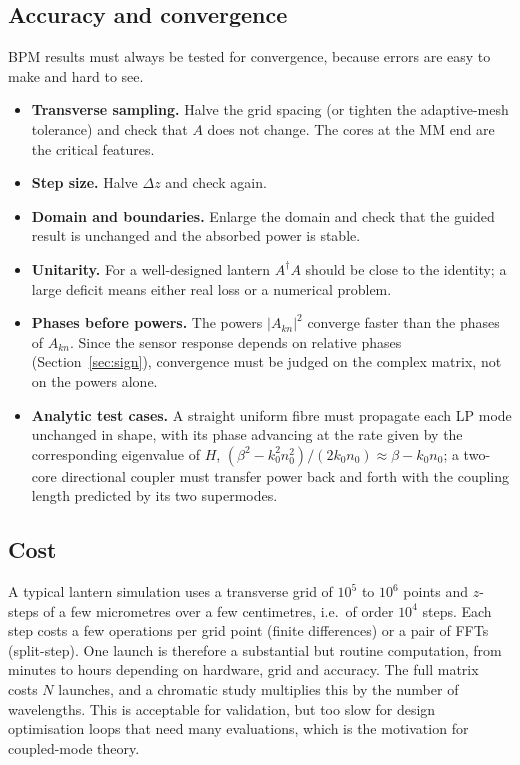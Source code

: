 \documentclass[11pt,a4paper]{article}
\begin{document}
\subsection{Accuracy and convergence}
BPM results must always be tested for convergence, because errors are easy to make and hard to see.
\begin{itemize}
\item \textbf{Transverse sampling.} Halve the grid spacing (or tighten the adaptive-mesh tolerance) and check that $A$ does not change. The cores at the MM end are the critical features.
\item \textbf{Step size.} Halve $\Delta z$ and check again.
\item \textbf{Domain and boundaries.} Enlarge the domain and check that the guided result is unchanged and the absorbed power is stable.
\item \textbf{Unitarity.} For a well-designed lantern $A^\dagger A$ should be close to the identity; a large deficit means either real loss or a numerical problem.
\item \textbf{Phases before powers.} The powers $|A_{kn}|^2$ converge faster than the phases of $A_{kn}$. Since the sensor response depends on relative phases (Section~\ref{sec:sign}), convergence must be judged on the complex matrix, not on the powers alone.
\item \textbf{Analytic test cases.} A straight uniform fibre must propagate each LP mode unchanged in shape, with its phase advancing at the rate given by the corresponding eigenvalue of $H$, $(\beta^2 - k_0^2 n_0^2)/(2 k_0 n_0) \approx \beta - k_0 n_0$; a two-core directional coupler must transfer power back and forth with the coupling length predicted by its two supermodes.
\end{itemize}

\subsection{Cost}
A typical lantern simulation uses a transverse grid of $10^5$ to $10^6$ points and $z$-steps of a few micrometres over a few centimetres, i.e.\ of order $10^4$ steps. Each step costs a few operations per grid point (finite differences) or a pair of FFTs (split-step). One launch is therefore a substantial but routine computation, from minutes to hours depending on hardware, grid and accuracy. The full matrix costs $N$ launches, and a chromatic study multiplies this by the number of wavelengths. This is acceptable for validation, but too slow for design optimisation loops that need many evaluations, which is the motivation for coupled-mode theory.
\end{document}
